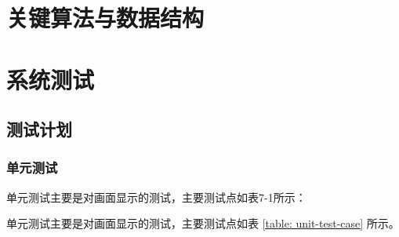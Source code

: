 \documentclass[printMode=true, declarePage=false]{ecnuthesis}
\begin{document}
\zhlipsum[11]


\chapter{关键算法与数据结构}

\zhlipsum[12]


\chapter{系统测试}

\section{测试计划}

\subsection{单元测试}

单元测试主要是对画面显示的测试，主要测试点如表7-1所示：

单元测试主要是对画面显示的测试，主要测试点如表 \ref{table: unit-test-case} 所示。
\end{document}
